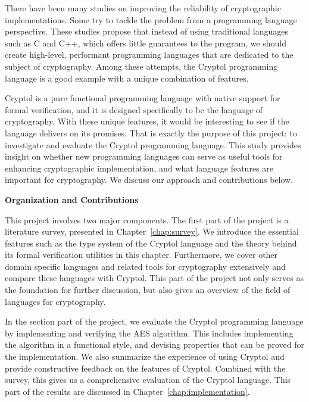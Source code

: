 \documentclass[a4paper, notitlepage]{report}
\renewcommand{\paragraph}[1]{\vspace*{1em}\noindent\textbf{#1}\hspace*{1em}}
\begin{document}
There have been many studies on improving the reliability of cryptographic
implementations. Some try to tackle the problem from a programming language
perspective.
These studies propose that instead of using traditional languages such as
C and C++, which offers little guarantees to the program, we should create high-level,
performant programming languages
that are dedicated to the subject of cryptography.
Among these attempts, the Cryptol programming language is a good example with
a unique combination of features. 

Cryptol is a pure functional programming language with native support for
formal verification, and it is designed specifically to be the language of
cryptography. With these unique features, it would be interesting to see if
the language delivers on its promises. That is exactly the purpose of this
project: to investigate and evaluate the Cryptol programming language.
This study provides insight on whether new programming languages can serve
as useful tools for enhancing cryptographic implementation, and what language
features are important for cryptography.
We discuss our approach and contributions below.

\paragraph{Organization and Contributions}

This project involves two major components. The first part of the project
is a literature survey, presented in Chapter~\ref{chap:survey}.
We introduce the essential features such as the type system of the Cryptol language
and the theory behind its formal verification utilities in this chapter.
Furthermore, we cover other domain specific languages and related tools for
cryptography extensively and compare these languages with Cryptol.
This part of the project not only serves as the foundation for further discussion,
but also gives an overview of the field of languages for cryptography.

In the section part of the project, we evaluate the Cryptol programming language
by implementing and verifying the AES algorithm. This includes implementing the
algorithm in a functional style, and devising properties that can be proved
for the implementation. We also summarize the experience of using Cryptol
and provide constructive feedback on the features of Cryptol. Combined with the survey,
this gives us a comprehensive evaluation of the Cryptol language.
This part of the results are discussed in Chapter~\ref{chap:implementation}.
\end{document}

